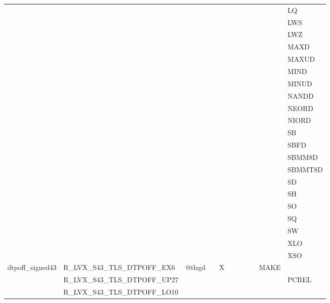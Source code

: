 {\begin{tabular}{|l|l|l|l|l|l|l|l|l|l|l|}
 & & & & & & & & & & \textsf{LQ} \\
 & & & & & & & & & & \textsf{LWS} \\
 & & & & & & & & & & \textsf{LWZ} \\
 & & & & & & & & & & \textsf{MAXD} \\
 & & & & & & & & & & \textsf{MAXUD} \\
 & & & & & & & & & & \textsf{MIND} \\
 & & & & & & & & & & \textsf{MINUD} \\
 & & & & & & & & & & \textsf{NANDD} \\
 & & & & & & & & & & \textsf{NEORD} \\
 & & & & & & & & & & \textsf{NIORD} \\
 & & & & & & & & & & \textsf{SB} \\
 & & & & & & & & & & \textsf{SBFD} \\
 & & & & & & & & & & \textsf{SBMM8D} \\
 & & & & & & & & & & \textsf{SBMMT8D} \\
 & & & & & & & & & & \textsf{SD} \\
 & & & & & & & & & & \textsf{SH} \\
 & & & & & & & & & & \textsf{SO} \\
 & & & & & & & & & & \textsf{SQ} \\
 & & & & & & & & & & \textsf{SW} \\
 & & & & & & & & & & \textsf{XLO} \\
 & & & & & & & & & & \textsf{XSO} \\
\hline
\textsf{dtpoff\_signed43} & \textsf{R\_LVX\_S43\_TLS\_DTPOFF\_EX6} & \textsf{@tlsgd} & \textsf{} & \textsf{X} & \textsf{} & \textsf{} & \textsf{} & \textsf{} & \textsf{MAKE} \\
 & \textsf{R\_LVX\_S43\_TLS\_DTPOFF\_UP27} & & & & & & & & & \textsf{PCREL} \\
 & \textsf{R\_LVX\_S43\_TLS\_DTPOFF\_LO10} & & & & & & & & & \\
\hline
\hline\end{tabular}
}
\smallskip

